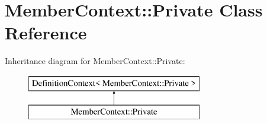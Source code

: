 \hypertarget{class_member_context_1_1_private}{}\section{Member\+Context\+::Private Class Reference}
\label{class_member_context_1_1_private}
Inheritance diagram for Member\+Context\+::Private\+:\begin{figure}[H]
\begin{center}
\leavevmode
\includegraphics[height=2.000000cm]{class_member_context_1_1_private}
\end{center}
\end{figure}
